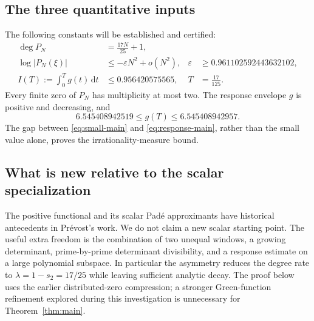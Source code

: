 \documentclass[11pt]{article}
\theoremstyle{definition}\newtheorem{definition}[theorem]{Definition}
\theoremstyle{remark}\newtheorem{remark}[theorem]{Remark}
\newcommand{\dd}{\,\mathrm d}
\begin{document}
\subsection{The three quantitative inputs}
The following constants will be established and certified:
\begin{align}
 \deg P_N&=\frac{17N}{25}+1,\label{eq:degree-main}\\
 \log|P_N(\xi)|&\le-\varepsilon N^2+o(N^2),
 &\varepsilon&\ge0.961102592443632102,\label{eq:small-main}\\
 I(T):=\int_0^T g(t)\dd t&\le0.956420575565,
 &T&=\frac{17}{125}.\label{eq:response-main}
\end{align}
Every finite zero of $P_N$ has multiplicity at most two. The response envelope $g$ is positive and decreasing, and
\[
 6.545408942519\le g(T)\le6.545408942957.
\]
The gap between \eqref{eq:small-main} and \eqref{eq:response-main}, rather than the small value alone, proves the irrationality-measure bound.

\subsection{What is new relative to the scalar specialization}
The positive functional and its scalar Pad\'e approximants have historical antecedents in Pr\'evost's work. We do not claim a new scalar starting point. The useful extra freedom is the combination of two unequal windows, a growing determinant, prime-by-prime determinant divisibility, and a response estimate on a large polynomial subspace. In particular the asymmetry reduces the degree rate to $\lambda=1-s_2=17/25$ while leaving sufficient analytic decay. The proof below uses the earlier distributed-zero compression; a stronger Green-function refinement explored during this investigation is unnecessary for Theorem~\ref{thm:main}.
\end{document}
